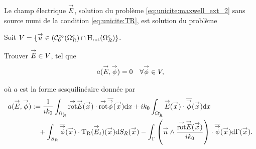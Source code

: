   \begin{prop}
    Le champ électrique \(\vE\), solution du problème \eqref{eq:unicite:maxwell_ext_2} sans source muni de la condition \eqref{eq:unicite:TR}, est solution du problème

    Soit \(V = \lbrace \vect{u} \in (\mathcal{C}_0^\infty(\OO^c_R)\cap\Hrot(\OO^c_R) \rbrace\).

    Trouver \(\vE \in V\), tel que
    \begin{align*}
      a(\vE,\vect\phi) = 0 && \forall \vect \phi \in V,
    \end{align*}

    où \(a\) est la forme sesquilinéaire donnée par
    \begin{equation*}
      \begin{aligned}
      a(\vE,\vect\phi) &:=  \frac{1}{ik_0} \int_{\OO^c_R} \trot \vE(\vx) \cdot \trot \conj{\vect{\phi}}(\vx) \dd{x} + ik_0\int_{\OO^c_R}\vE(\vx)\cdot\conj{\vect{\phi}}(\vx) \dd{x}
        \\ 
        & \quad + \int_{S_R} \conj{ \vect \phi }(\vx) \cdot \Tr(\vE_t)(\vx) \dd{S_R}(\vx) - \int_\Gamma \left(\vn \pvect \frac{\trot \vE(\vx)}{ik_0}\right) \cdot \conj{\vect \phi} (\vx) \dd{\Gamma}(\vx).
      \end{aligned}
    \end{equation*}
  \end{prop}
